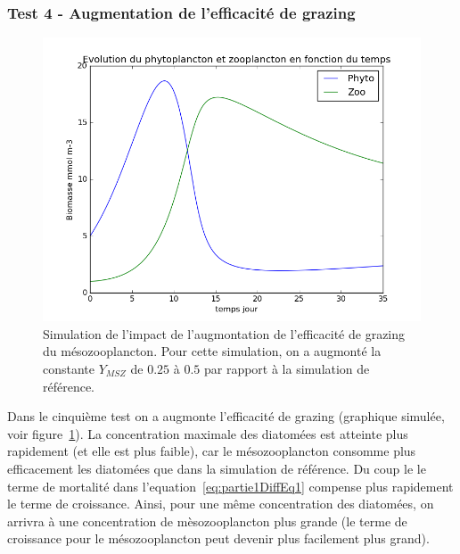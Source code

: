 {\subsubsection{Test 4 - Augmentation de l'efficacité de grazing}
\begin{figure}[h!]
  \includegraphics[width=\textwidth]{partie1/test4x35.png}
  \caption{Simulation de l'impact de l'augmontation de l'efficacité de grazing du mésozooplancton. Pour
cette simulation, on a augmonté la constante $Y_{MSZ}$ de $0.25$ à $0.5$ par rapport à la simulation de
référence.}
  \label{fig:partie1t4}
\end{figure}
\par{
Dans le cinquième test on a augmonte l'efficacité de grazing (graphique simulée, voir
figure~\ref{fig:partie1t4}).
La concentration maximale des diatomées est atteinte plus rapidement (et elle est plus faible), car
le mésozooplancton consomme plus efficacement les diatomées que dans la simulation de référence. Du coup le 
le terme de mortalité dans l'equation~\ref{eq:partie1DiffEq1} compense plus rapidement le terme de
croissance. Ainsi, pour une même concentration des diatomées, on arrivra à une concentration de
mèsozooplancton plus grande (le terme de croissance pour le mésozooplancton peut devenir plus facilement plus
grand).
}
\FloatBarrier

\clearpage
}
